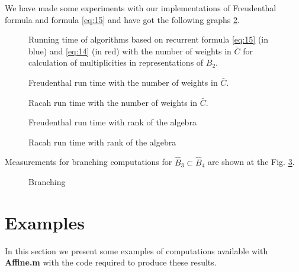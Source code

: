 \documentclass[preprint,12pt]{elsarticle}
\begin{document}
We have made some experiments with our implementations of Freudenthal formula and formula \eqref{eq:15} and have got the following graphs \ref{freudenthal-racah-times}.
\begin{figure}[h]
  \label{freudenthal-racah-times}
  \noindent{}
  \caption{Running time of algorithms based on recurrent formula \eqref{eq:15} (in blue) and \eqref{eq:14} (in red) with the number of weights in $\bar C$ for calculation of multiplicities in representations of $B_{2}$.}
\end{figure}

\begin{figure}[h]
  \label{freudenthal-racah-times}
  \noindent\centering{
  }
  \caption{Freudenthal run time with the number of weights in $\bar C$.}

  \noindent\centering{
  }
  \caption{Racah run time with the number of weights in $\bar C$.}

  \noindent\centering{
  }
  \caption{Freudenthal run time with rank of the algebra}

  \noindent\centering{
  }
  \caption{Racah run time with rank of the algebra}
\end{figure}

Measurements for branching computations for $\hat B_{3}\subset \hat B_{4}$ are shown at the Fig. \ref{fig:branching}.
\begin{figure}[h]
  \label{fig:branching}
  \noindent\centering{
  }
  \caption{Branching}
\end{figure}

\section{Examples}
\label{sec:examples}
In this section we present some examples of computations available with {\bf Affine.m} with the code required to produce these results. 
\end{document}
